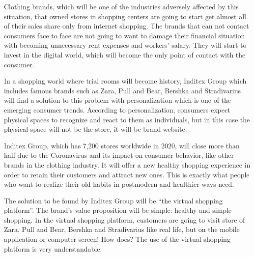 \documentclass[]{book}
\begin{document}
Clothing brands, which will be one of the industries adversely affected by this situation, that owned stores in shopping centers are going to start get almost all of their sales share only from internet shopping. The brands that can not contact consumers face to face are not going to want to damage their financial situation with becoming unnecessary rent expenses and workers' salary. They will start to invest in the digital world, which will become the only point of contact with the consumer.

In a shopping world where trial rooms will become history, Inditex Group which includes famous brands such as Zara, Pull and Bear, Bershka and Stradivarius will find a solution to this problem with personalization which is one of the emerging consumer trends. According to personalization, consumers expect physical spaces to recognize and react to them as individuals, but in this case the physical space will not be the store, it will be brand website.

Inditex Group, which has 7,200 stores worldwide in 2020, will close more than half due to the Coronavirus and its impact on consumer behavior, like other brands in the clothing industry. It will offer a new healthy shopping experience in order to retain their customers and attract new ones. This is exactly what people who want to realize their old habits in postmodern and healthier ways need.

The solution to be found by Inditex Group will be ``the virtual shopping platform''. The brand's value proposition will be simple: healthy and simple shopping. In the virtual shopping platform, customers are going to visit store of Zara, Pull and Bear, Bershka and Stradivarius like real life, but on the mobile application or computer screen! How does? The use of the virtual shopping platform is very understandable:
\end{document}

